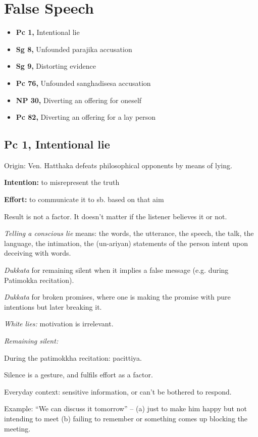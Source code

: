 \chapter{False Speech}

\begin{itemize}
\tightlist
\item
  \textbf{Pc 1,} Intentional lie
\item
  \textbf{Sg 8,} Unfounded parajika accusation
\item
  \textbf{Sg 9,} Distorting evidence
\item
  \textbf{Pc 76,} Unfounded sanghadisesa accusation
\item
  \textbf{NP 30,} Diverting an offering for oneself
\item
  \textbf{Pc 82,} Diverting an offering for a lay person
\end{itemize}

\section{Pc 1, Intentional lie}

Origin: Ven. Hatthaka defeats philosophical opponents by means of lying.

\textbf{Intention:} to misrepresent the truth

\textbf{Effort:} to communicate it to sb. based on that aim

Result is not a factor. It doesn't matter if the listener believes it or
not.

\emph{Telling a conscious lie} means: the words, the utterance, the
speech, the talk, the language, the intimation, the (un-ariyan)
statements of the person intent upon deceiving with words.

\emph{Dukkata} for remaining silent when it implies a false message
(e.g. during Patimokka recitation).

\emph{Dukkata} for broken promises, where one is making the promise with
pure intentions but later breaking it.

\emph{White lies:} motivation is irrelevant.

\emph{Remaining silent:}

During the patimokkha recitation: pacittiya.

Silence is a gesture, and fulfils effort as a factor.

Everyday context: sensitive information, or can't be bothered to
respond.

Example: ``We can discuss it tomorrow'' -- (a) just to make him happy
but not intending to meet (b) failing to remember or something comes up
blocking the meeting.

